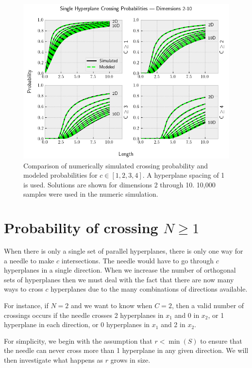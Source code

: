 \documentclass{article}
\begin{document}
\begin{figure}[h]
	\centerline{\includegraphics[width=5in]{numeric_sim_N1.png}}
	\caption{Comparison of numerically simulated crossing probability and modeled probabilities
	for $c\in[1, 2, 3, 4]$. A hyperplane spacing of 1 is used. Solutions are shown for dimensions 2 through 10. 10,000 samples were
	used in the numeric simulation.}
	\label{fig:numeric sim N1}
\end{figure}

\section{Probability of crossing $N\ge 1$}
When there is only a single set of parallel hyperplanes, there is only one way for a needle to make
$c$ intersections. The needle would have to go through $c$ hyperplanes in a single direction.
When we increase the number of orthogonal sets of hyperplanes then we must deal with the fact that
there are now many ways to cross $c$ hyperplanes due to the many combinations of directions available.

For instance, if $N=2$ and we want to know when $C=2$, then a valid number of crossings occurs if the
needle crosses 2 hyperplanes in $x_1$ and 0 in $x_2$, or 1 hyperplane in each direction, or 0 hyperplanes
in $x_1$ and 2 in $x_2$.

For simplicity, we begin with the assumption that $r<\min(S)$ to ensure that the needle can never cross
more than 1 hyperplane in any given direction. We will then investigate what happens as $r$ grows in
size.
\end{document}
